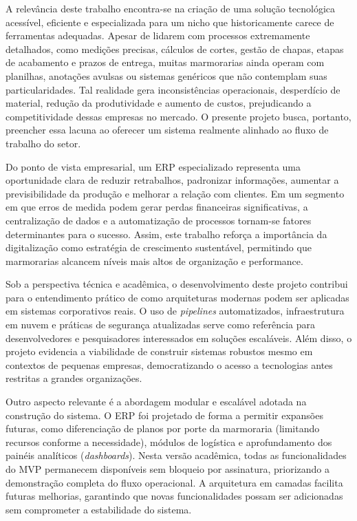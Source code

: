 A relevância deste trabalho encontra-se na criação de uma solução tecnológica acessível, eficiente e especializada para um nicho que historicamente carece de ferramentas adequadas. Apesar de lidarem com processos extremamente detalhados, como medições precisas, cálculos de cortes, gestão de chapas, etapas de acabamento e prazos de entrega, muitas marmorarias ainda operam com planilhas, anotações avulsas ou sistemas genéricos que não contemplam suas particularidades. Tal realidade gera inconsistências operacionais, desperdício de material, redução da produtividade e aumento de custos, prejudicando a competitividade dessas empresas no mercado. O presente projeto busca, portanto, preencher essa lacuna ao oferecer um sistema realmente alinhado ao fluxo de trabalho do setor.

Do ponto de vista empresarial, um ERP especializado representa uma oportunidade clara de reduzir retrabalhos, padronizar informações, aumentar a previsibilidade da produção e melhorar a relação com clientes. Em um segmento em que erros de medida podem gerar perdas financeiras significativas, a centralização de dados e a automatização de processos tornam-se fatores determinantes para o sucesso. Assim, este trabalho reforça a importância da digitalização como estratégia de crescimento sustentável, permitindo que marmorarias alcancem níveis mais altos de organização e performance.

Sob a perspectiva técnica e acadêmica, o desenvolvimento deste projeto contribui para o entendimento prático de como arquiteturas modernas podem ser aplicadas em sistemas corporativos reais. O uso de \textit{pipelines} automatizados, infraestrutura em nuvem e práticas de segurança atualizadas serve como referência para desenvolvedores e pesquisadores interessados em soluções escaláveis. Além disso, o projeto evidencia a viabilidade de construir sistemas robustos mesmo em contextos de pequenas empresas, democratizando o acesso a tecnologias antes restritas a grandes organizações.

Outro aspecto relevante é a abordagem modular e escalável adotada na construção do sistema. O ERP foi projetado de forma a permitir expansões futuras, como diferenciação de planos por porte da marmoraria (limitando recursos conforme a necessidade), módulos de logística e aprofundamento dos painéis analíticos (\textit{dashboards}). Nesta versão acadêmica, todas as funcionalidades do MVP permanecem disponíveis sem bloqueio por assinatura, priorizando a demonstração completa do fluxo operacional. A arquitetura em camadas facilita futuras melhorias, garantindo que novas funcionalidades possam ser adicionadas sem comprometer a estabilidade do sistema.

